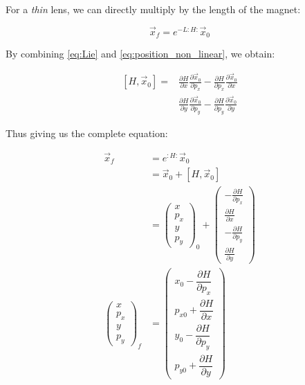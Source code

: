 \documentclass[openright,twoside,headsepline,bibliography=totoc]{scrbook}
\begin{document}
For a \emph{thin} lens, we can directly multiply by the length of the
magnet:

\begin{equation}\vec{x}_f = e^{-L:H:} \vec{x}_0\label{eq:position_non_linear_thin}\end{equation}

By combining \cref{eq:Lie} and \cref{eq:position_non_linear}, we obtain:

\begin{equation}
\begin{aligned}
\left[H, \vec{x}_0\right] =& \frac{\partial H}{\partial x} \frac{\partial \vec{x}_0}{\partial p_x} 
                                    -\frac{\partial H}{\partial p_x} \frac{\partial \vec{x}_0}{\partial x} \\
                           &\frac{\partial H}{\partial y} \frac{\partial \vec{x}_0}{\partial p_y} 
                                    -\frac{\partial H}{\partial p_y} \frac{\partial \vec{x}_0}{\partial y}
\end{aligned}
\label{eq:bracket_hamiltonian}\end{equation}

Thus giving us the complete equation:

\begin{equation}
\begin{aligned}
\vec{x}_f &= e^{:H:}\vec{x}_0 \\
          &= \vec{x}_0 + \left[H, \vec{x}_0\right] \\
          &= \begin{pmatrix} x \\ p_x \\ y \\ p_y\end{pmatrix}_0
             + \begin{pmatrix} -\frac{\partial H}{\partial p_x} \\ 
                               \frac{\partial H}{\partial x} \\
                               -\frac{\partial H}{\partial p_y} \\
                               \frac{\partial H}{\partial y}
               \end{pmatrix} \\
\begin{pmatrix} x \\ 
                p_{x} \\
                y \\
                p_{y} 
\end{pmatrix}_f
          &=  \begin{pmatrix} x_0 - \dfrac{\partial H}{\partial p_x} \\ 
                               p_{x0} +\dfrac{\partial H}{\partial x} \\
                               y_0 - \dfrac{\partial H}{\partial p_y} \\
                               p_{y0} +\dfrac{\partial H}{\partial y}
               \end{pmatrix}
\end{aligned}
\label{eq:non_linear_map}\end{equation}
\end{document}
